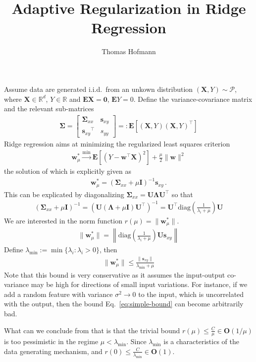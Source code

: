\documentclass{article}
\title{Adaptive Regularization in Ridge Regression}
\author{Thomas Hofmann}
\renewcommand{\Re}{{\mathbb R}}
\newcommand{\X}{{\mathbf X}}
\newcommand{\Cov}{{\mathbf \Sigma}}
\newcommand{\Covxx}{{\Cov_{xx}}}
\newcommand{\Covxy}{{\mathbf s_{xy}}}
\newcommand{\Covyy}{{s_{yy}}}
\newcommand{\Y}{{Y}}
\newcommand{\I}{{\mathbf I}}
\newcommand{\w}{{\mathbf w}}
\newcommand{\mU}{{\mathbf U}}
\newcommand{\mL}{{\mathbf \Lambda}}
\newcommand{\cP}{{\mathcal P}}
\newcommand{\diag}[1]{{\text{diag}\left(#1\right)}}
\newcommand{\E}{\mathbf E}
\begin{document}
\maketitle

Assume data are  generated i.i.d.~from an unkown distribution $(\X,\Y) \sim \cP$, where $\X \in \Re^d$, $\Y \in \Re$ and $\E\X = \mathbf 0$, $\E\Y =0$. Define the variance-covariance matrix and the relevant sub-matrices
\begin{align}
\Cov = 
\begin{bmatrix} \Covxx & \Covxy \\[1mm] \Covxy^\top & \Covyy \end{bmatrix} =:
\E\left[ (\X, \Y) (\X, \Y)^\top \right]
\end{align}
Ridge regression aims at minimizing the regularized least squares criterion 
\begin{align}
\w^*_\mu \stackrel{\min}{\longrightarrow}  \E \left[ (\Y - \w^\top \X)^2 \right] + \frac \mu 2 \| \w\|^2
\end{align}
the solution of which is explicitly given as 
\begin{align}
\w^*_\mu = \left( \Covxx + \mu  \I \right)^{-1} \Covxy \,.
\end{align}
This can be explicated by diagonalizing $\Covxx = \mU \mL \mU^\top$ so that 
\begin{align}
\left( \Covxx + \mu \I \right)^{-1} = \left( \mU (\mL + \mu \I ) \mU^\top \right)^{-1} = \mU^\top \diag{\frac{1}{\lambda_i + \mu}} \mU
\end{align}
We are interested in the norm function $r(\mu) = \| \w_\mu^*\|$.  
\begin{align}
\| \w_\mu^* \| = \left\| \diag{\frac{1}{\lambda_i + \mu}} \mU \Covxy \right\|
\end{align}
Define $\lambda_{\min} := \min\{  \lambda_i: \lambda_i >0\}$, then 
\begin{align}
\| \w_\mu^* \| \le \frac{\| \Covxy \|}{\lambda_{\min} + \mu} 
\label{eq:simple-bound}
\end{align}
Note that this bound is very conservative as it assumes the input-output co-variance may be high for directions of small input variations. For instance, if we add a random feature with variance $\sigma^2 \to 0$ to the input, which is uncorrelated with the output, then the bound Eq.~\eqref{eq:simple-bound} can become arbitrarily bad. 

\newpage


What can we conclude from that  is that the trivial bound $r(\mu) \le \frac{C}{\mu} \in \mathbf O(1/\mu)$ is too pessimistic in the regime $\mu < \lambda_{\min}$. Since $\lambda_{\min}$ is a characteristics of the data generating mechanism, and $r(0) \le \frac{C}{\lambda_{\min}} \in \mathbf O(1)$.
\end{document}
